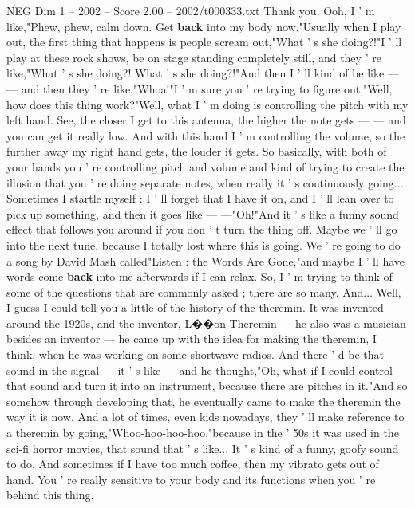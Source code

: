 \begin{textsample}{NEG Dim 1 – 2002 – Score 2.00 – 2002/t000333.txt}  \label{ex:f1_neg_063}
Thank you.
Ooh, I ' m like,"Phew, phew, calm down.
Get \textbf{back} into my body now."Usually when I play out, the first thing that happens is people scream out,"What ' s she doing?!"I ' ll play at these rock shows, be on stage standing completely still, and they ' re like,"What ' s she doing?!
What ' s she doing?!"And then I ' ll kind of be like — — and then they ' re like,"Whoa!"I ' m sure you ' re trying to figure out,"Well, how does this thing work?"Well, what I ' m doing is controlling the pitch with my left hand.
See, the closer I get to this antenna, the higher the note gets — — and you can get it really low.
And with this hand I ' m controlling the volume, so the further away my right hand gets, the louder it gets.
So basically, with both of your hands you ' re controlling pitch and volume and kind of trying to create the illusion that you ' re doing separate notes, when really it ' s continuously going...
Sometimes I startle myself : I ' ll forget that I have it on, and I ' ll lean over to pick up something, and then it goes like — —"Oh!"And it ' s like a funny sound effect that follows you around if you don ' t turn the thing off.
Maybe we ' ll go into the next tune, because I totally lost where this is going.
We ' re going to do a song by David Mash called"Listen : the Words Are Gone,"and maybe I ' ll have words come \textbf{back} into me afterwards if I can relax.
So, I ' m trying to think of some of the questions that are commonly asked ; there are so many.
And...
Well, I guess I could tell you a little of the history of the theremin.
It was invented around the 1920s, and the inventor, L{\EmojiFont �}{\EmojiFont �}on Theremin — he also was a musician besides an inventor — he came up with the idea for making the theremin, I think, when he was working on some shortwave radios.
And there ' d be that sound in the signal — it ' s like — and he thought,"Oh, what if I could control that sound and turn it into an instrument, because there are pitches in it."And so somehow through developing that, he eventually came to make the theremin the way it is now.
And a lot of times, even kids nowadays, they ' ll make reference to a theremin by going,"Whoo-hoo-hoo-hoo,"because in the ' 50s it was used in the sci-fi horror movies, that sound that ' s like...
It ' s kind of a funny, goofy sound to do.
And sometimes if I have too much coffee, then my vibrato gets out of hand.
You ' re really sensitive to your body and its functions when you ' re behind this thing.

\end{textsample}
